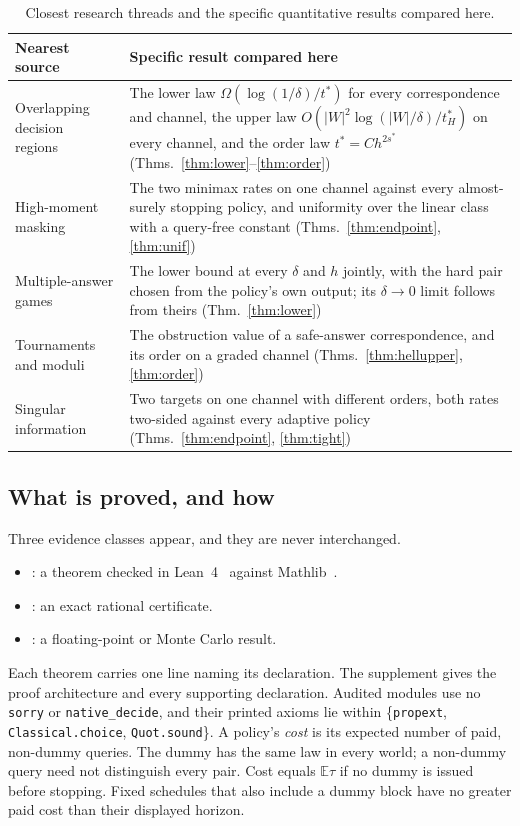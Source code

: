 \begin{table}[h]
\caption{Closest research threads and the specific quantitative results compared here.}
\label{tab:prior}
\centering
\footnotesize
\begin{tabular}{@{}p{}p{}@{}}
\toprule
Nearest source & Specific result compared here \\
\midrule
Overlapping decision regions~\cite{javdani2014} & The lower law $\Omega(\log(1/\delta)/t^{*})$
for every correspondence and channel, the upper law $O(|W|^{2}\log(|W|/\delta)/t^{*}_{H})$ on every
channel, and the order law $t^{*}=Ch^{2s^{*}}$ (Thms.~\ref{thm:lower}--\ref{thm:order}) \\
High-moment masking~\cite{grosso2014,duc2015} & The two minimax rates on one channel against
every almost-surely stopping policy, and uniformity over the linear class with a
query-free constant (Thms.~\ref{thm:endpoint}, \ref{thm:unif}) \\
Multiple-answer games~\cite{degenne2019,wangyou2026} & The lower bound at every $\delta$ and
$h$ jointly, with the hard pair chosen from the policy's own output; its $\delta\to0$ limit
follows from theirs (Thm.~\ref{thm:lower}) \\
Tournaments and moduli~\cite{lecam1973,birge1983,donoho1991} & The obstruction value of a
safe-answer correspondence, and its order on a graded channel (Thms.~\ref{thm:hellupper},
\ref{thm:order}) \\
Singular information~\cite{rotnitzky2000,heinrich2018,honguyen2015} & Two targets on one
channel with different orders, both rates two-sided against every adaptive policy
(Thms.~\ref{thm:endpoint}, \ref{thm:tight}) \\
\bottomrule
\end{tabular}
\end{table}

\subsection{What is proved, and how}

Three evidence classes appear, and they are never interchanged.
\begin{itemize}
\item \PROVED: a theorem checked in Lean~4~\cite{demoura2021} against Mathlib~\cite{mathlib2020}.
\item \CERT: an exact rational certificate.
\item \NUM: a floating-point or Monte Carlo result.
\end{itemize}
Each theorem carries one line naming its declaration. The supplement gives the proof
architecture and every supporting declaration. Audited modules use no \texttt{sorry} or
\texttt{native\_decide}, and their printed axioms lie within \{\texttt{propext},
\texttt{Classical.choice}, \texttt{Quot.sound}\}. A policy's \emph{cost} is its expected
number of paid, non-dummy queries. The dummy has the same law in every world; a non-dummy
query need not distinguish every pair. Cost equals $\mathbb{E}\tau$ if no dummy is issued
before stopping. Fixed schedules that also include a dummy block have no greater paid cost
than their displayed horizon.

